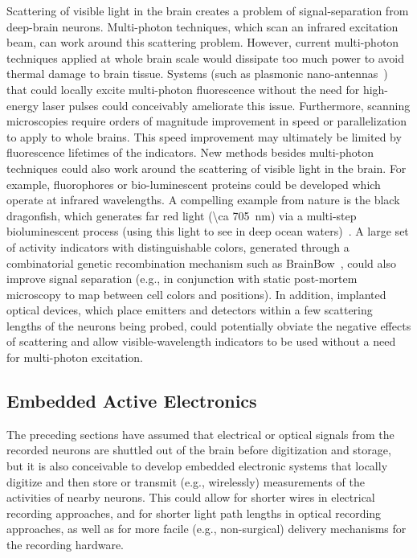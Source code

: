 Scattering of visible light in the brain creates a problem of signal-separation from deep-brain neurons.
Multi-photon techniques, which scan an infrared excitation beam, can work around this scattering problem.
However, current multi-photon techniques applied at whole brain scale would dissipate too much power to avoid thermal damage to brain tissue.
Systems (such as plasmonic nano-antennas~\cite{blanchard11}) that could locally excite multi-photon fluorescence without the need for high-energy laser pulses could conceivably ameliorate this issue.
Furthermore, scanning microscopies require orders of magnitude improvement in speed or parallelization to apply to whole brains.
This speed improvement may ultimately be limited by fluorescence lifetimes of the indicators.
New methods besides multi-photon techniques could also work around the scattering of visible light in the brain.
For example, fluorophores or bio-luminescent proteins could be developed which operate at infrared wavelengths.
A compelling example from nature is the black dragonfish, which generates far red light (\SI{\ca 705}{\nano\meter}) via a multi-step bioluminescent process (using this light to see in deep ocean waters)~\cite{widder84,campbell87}.
A large set of activity indicators with distinguishable colors, generated through a combinatorial genetic recombination mechanism such as BrainBow~\cite{livet07}, could also improve signal separation (e.g., in conjunction with static post-mortem microscopy to map between cell colors and positions).
In addition, implanted optical devices, which place emitters and detectors within a few scattering lengths of the neurons being probed, could potentially obviate the negative effects of scattering and allow visible-wavelength indicators to be used without a need for multi-photon excitation.

\subsection{Embedded Active Electronics}

The preceding sections have assumed that electrical or optical signals from the recorded neurons are shuttled out of the brain before digitization and storage, but it is also conceivable to develop embedded electronic systems that locally digitize and then store or transmit (e.g., wirelessly) measurements of the activities of nearby neurons.
This could allow for shorter wires in electrical recording approaches, and for shorter light path lengths in optical recording approaches, as well as for more facile (e.g., non-surgical) delivery mechanisms for the recording hardware.

